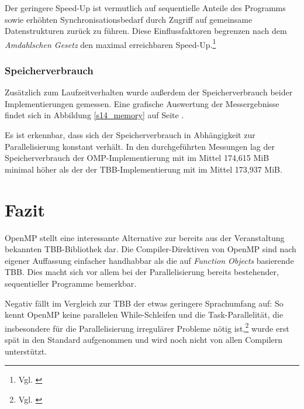 \documentclass[11pt]{scrartcl}
\begin{document}
Der geringere Speed-Up ist vermutlich auf sequentielle Anteile des Programms sowie erhöhten Synchronisationsbedarf durch Zugriff auf gemeinsame Datenstrukturen zurück zu führen. Diese Einflussfaktoren begrenzen nach dem \emph{Amdahlschen Gesetz} den maximal erreichbaren Speed-Up.\footnote{Vgl. \cite[S.~318]{bengel_masterkurs_2008}}




\subsubsection{Speicherverbrauch}

Zusätzlich zum Laufzeitverhalten wurde außerdem der Speicherverbrauch beider Implementierungen gemessen. Eine grafische Auswertung der Messergebnisse findet sich in Abbildung \ref{s14_memory} auf Seite \pageref{s14_memory}.

Es ist erkennbar, dass sich der Speicherverbrauch in Abhängigkeit zur Parallelisierung konstant verhält. In den durchgeführten Messungen lag der Speicherverbrauch der OMP-Implementierung mit im Mittel 174,615 MiB minimal höher als der der TBB-Implementier\-ung mit im Mittel 173,937 MiB.

\section{Fazit}

OpenMP stellt eine interessante Alternative zur bereits aus der Veranstaltung bekannten TBB-Bibliothek dar. Die Compiler-Direktiven von OpenMP sind nach eigener Auffassung einfacher handhabbar als die auf \emph{Function Objects} basierende TBB. Dies macht sich vor allem bei der Parallelisierung bereits bestehender, sequentieller Programme bemerkbar.

Negativ fällt im Vergleich zur TBB der etwas geringere Sprachumfang auf: So kennt OpenMP keine parallelen While-Schleifen und die Task-Parallelität, die insbesondere für die Parallelisierung irregulärer Probleme nötig ist,\footnote{Vgl. \cite[S.~6]{duran_tasking_2009}} wurde erst spät in den Standard aufgenommen und wird noch nicht von allen Compilern unterstützt.
\end{document}
